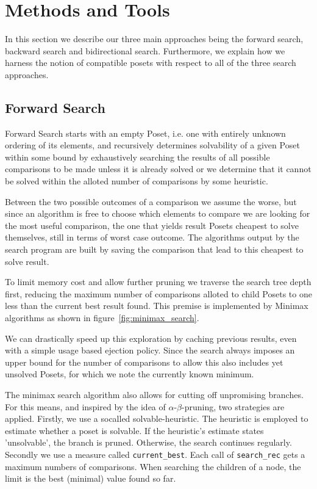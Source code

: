 \documentclass[10pt,journal,compsoc]{IEEEtran}
\begin{document}
\section{Methods and Tools}
In this section we describe our three main approaches being the forward search, backward search and bidirectional search. Furthermore, we explain how we harness the notion of compatible posets with respect to all of the three search approaches.

\subsection{Forward Search}\label{chapter:forward_search}
Forward Search starts with an empty Poset, i.e. one with entirely unknown ordering of its elements,
and recursively determines solvability of a given Poset within some bound by exhaustively searching
the results of all possible comparisons to be made unless it is already solved or we determine that
it cannot be solved within the alloted number of comparisons by some heuristic.

Between the two possible outcomes of a comparison we assume the worse, but since an algorithm is
free to choose which elements to compare we are looking for the most useful comparison, the one that
yields result Posets cheapest to solve themselves, still in terms of worst case outcome. The
algorithms output by the search program are built by saving the comparison that lead to this
cheapest to solve result.

To limit memory cost and allow further pruning we traverse the search tree depth first, reducing the
maximum number of comparisons alloted to child Posets to one less than the current best result
found. This premise is implemented by Minimax algorithms as shown in
figure~\ref{fig:minimax_search}.

We can drastically speed up this exploration by caching previous results, even with a simple usage
based ejection policy. Since the search always imposes an upper bound for the number of comparisons
to allow this also includes yet unsolved Posets, for which we note the currently known minimum.

The minimax search algorithm also allows for cutting off unpromising branches. For this means, and inspired by the idea of $\alpha$-$\beta$-pruning, two strategies are applied.
Firstly, we use a socalled solvable-heuristic. 
The heuristic is employed to estimate whether a poset is solvable. If the heuristic's estimate states 'unsolvable', the branch is pruned.
Otherwise, the search continues regularly.
Secondly we use a measure called \texttt{current\_best}. 
Each call of \texttt{search\_rec} gets a maximum numbers of comparisons. When searching the children of a node, the limit is the best (minimal) value found so far.
\end{document}
